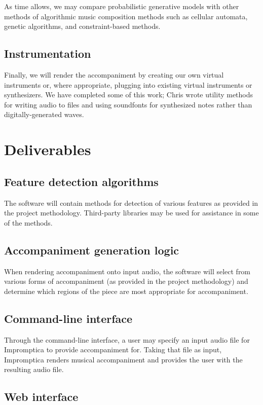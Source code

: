 \documentclass[11pt,conference,letterpaper]{IEEEtran}
\begin{document}
As time allows, we may compare probabilistic generative models with other methods of algorithmic music composition methods such as cellular automata, genetic algorithms, and constraint-based methods.

\subsection{Instrumentation}

Finally, we will render the accompaniment by creating our own virtual instruments or, where appropriate, plugging into existing virtual instruments or synthesizers. We have completed some of this work; Chris wrote utility methods for writing audio to files and using soundfonts for synthesized notes rather than digitally-generated waves.

\section{Deliverables}

\subsection{Feature detection algorithms}

The software will contain methods for detection of various features as provided in the project methodology. Third-party libraries may be used for assistance in some of the methods.

\subsection{Accompaniment generation logic}

When rendering accompaniment onto input audio, the software will select from various forms of accompaniment (as provided in the project methodology) and determine which regions of the piece are most appropriate for accompaniment.

\subsection{Command-line interface}

Through the command-line interface, a user may specify an input audio file for Impromptica to provide accompaniment for. Taking that file as input, Impromptica renders musical accompaniment and provides the user with the resulting audio file.

\subsection{Web interface}
\end{document}
